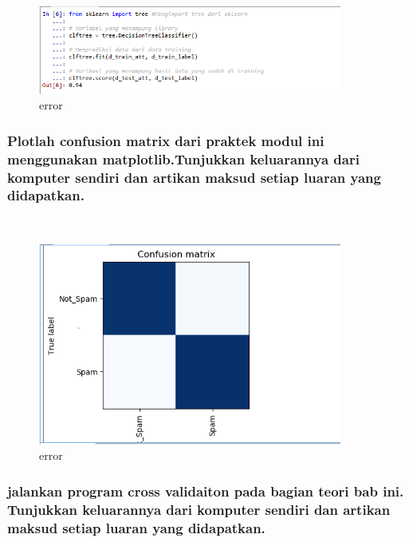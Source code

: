 	
		
	\begin{figure}[H]
		\begin{center}
		 \includegraphics[width=10cm]{figures/1174076/figures4/10.png}
		 \caption{error}	
		\end{center}
	\end{figure}

	\subsubsection{Plotlah confusion matrix dari praktek modul ini menggunakan matplotlib.Tunjukkan keluarannya dari komputer sendiri dan artikan maksud setiap luaran yang didapatkan.}\hfill\\
	
	
		
	\begin{figure}[H]
		\begin{center}
		 \includegraphics[width=10cm]{figures/1174076/figures4/11.png}
		 \caption{error}	
		\end{center}
	\end{figure}

	\subsubsection{jalankan program cross validaiton pada bagian teori bab ini. Tunjukkan keluarannya dari komputer sendiri dan artikan maksud setiap luaran yang didapatkan.}\hfill\\
	
